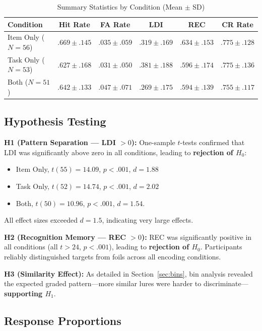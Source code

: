 \documentclass[12pt]{article}
\begin{document}
\begin{table}[H]
\centering
\caption{Summary Statistics by Condition (Mean $\pm$ SD)}
\label{tab:summary}
\footnotesize
\begin{tabular}{lccccc}
\toprule
\textbf{Condition} & \textbf{Hit Rate} & \textbf{FA Rate} & \textbf{LDI} & \textbf{REC} & \textbf{CR Rate} \\
\midrule
Item Only ($N\!=\!56$) & $.669 \pm .145$ & $.035 \pm .059$ & $.319 \pm .169$ & $.634 \pm .153$ & $.775 \pm .128$ \\
Task Only ($N\!=\!53$) & $.627 \pm .168$ & $.031 \pm .050$ & $.381 \pm .188$ & $.596 \pm .174$ & $.775 \pm .136$ \\
Both ($N\!=\!51$)      & $.642 \pm .133$ & $.047 \pm .071$ & $.269 \pm .175$ & $.594 \pm .139$ & $.755 \pm .117$ \\
\bottomrule
\end{tabular}
\end{table}

\subsection{Hypothesis Testing}


\textbf{H1 (Pattern Separation --- LDI $> 0$):} One-sample $t$-tests confirmed that LDI was significantly above zero in all conditions, leading to \textbf{rejection of $H_0$}: 
\begin{itemize}[nosep, leftmargin=1.5em]
\item Item Only, $t(55) = 14.09$, $p < .001$, $d = 1.88$
\item Task Only, $t(52) = 14.74$, $p < .001$, $d = 2.02$
\item Both, $t(50) = 10.96$, $p < .001$, $d = 1.54$. 
\end{itemize}
All effect sizes exceeded $d = 1.5$, indicating very large effects.

\textbf{H2 (Recognition Memory --- REC $> 0$):} REC was significantly positive in all conditions (all $t > 24$, $p < .001$), leading to \textbf{rejection of $H_0$}. Participants reliably distinguished targets from foils across all encoding conditions.

\textbf{H3 (Similarity Effect):} As detailed in Section~\ref{sec:bins}, bin analysis revealed the expected graded pattern---more similar lures were harder to discriminate---\textbf{supporting $H_1$}.

\subsection{Response Proportions}
\end{document}
